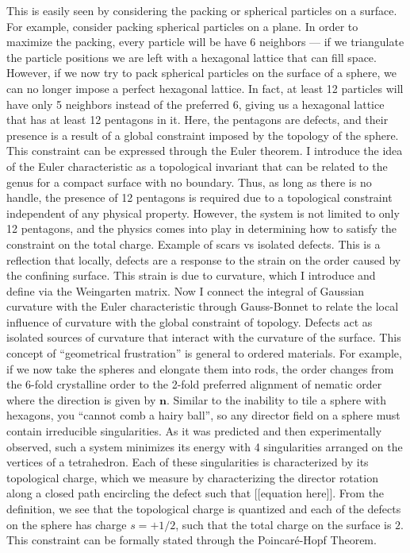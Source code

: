 This is easily seen by considering the packing or spherical particles on a surface.
For example, consider packing spherical particles on a plane.
In order to maximize the packing, every particle will be have 6 neighbors --- if we triangulate the particle positions we are left with a hexagonal lattice that can fill space.
However, if we now try to pack spherical particles on the surface of a sphere, we can no longer impose a perfect hexagonal lattice.
In fact, at least 12 particles will have only 5 neighbors instead of the preferred 6, giving us a hexagonal lattice that has at least 12 pentagons in it.
Here, the pentagons are defects, and their presence is a result of a global constraint imposed by the topology of the sphere.
This constraint can be expressed through the Euler theorem.
I introduce the idea of the Euler characteristic as a topological invariant that can be related to the genus for a compact surface with no boundary.
Thus, as long as there is no handle, the presence of 12 pentagons is required due to a topological constraint independent of any physical property.
However, the system is not limited to only 12 pentagons, and the physics comes into play in determining how to satisfy the constraint on the total charge.
Example of scars vs isolated defects.
This is a reflection that locally, defects are a response to the strain on the order caused by the confining surface.
This strain is due to curvature, which I introduce and define via the Weingarten matrix.
Now I connect the integral of Gaussian curvature with the Euler characteristic through Gauss-Bonnet to relate the local influence of curvature with the global constraint of topology.
Defects act as isolated sources of curvature that interact with the curvature of the surface.
This concept of ``geometrical frustration'' is general to ordered materials.
For example, if we now take the spheres and elongate them into rods, the order changes from the 6-fold crystalline order to the 2-fold preferred alignment of nematic order where the direction is given by $\mathbf{n}$.
Similar to the inability to tile a sphere with hexagons, you ``cannot comb a hairy ball'', so any director field on a sphere must contain irreducible singularities.
As it was predicted and then experimentally observed, such a system minimizes its energy with 4 singularities arranged on the vertices of a tetrahedron.
Each of these singularities is characterized by its topological charge, which we measure by characterizing the director rotation along a closed path encircling the defect such that [[equation here]].
From the definition, we see that the topological charge is quantized and each of the defects on the sphere has charge $s=+1/2$, such that the total charge on the surface is $2$.
This constraint can be formally stated through the Poincar\'e-Hopf Theorem.

